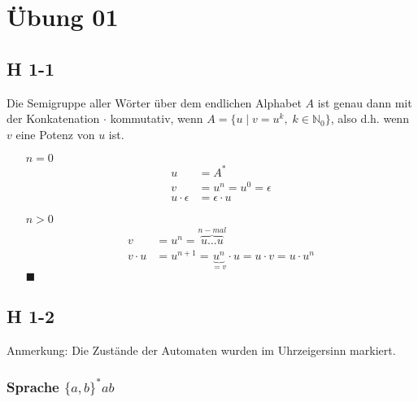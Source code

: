 \documentclass{scrartcl}
\begin{document}
\section{Übung 01}

\subsection{H 1-1}

Die Semigruppe aller Wörter über dem endlichen Alphabet $A$ ist genau dann mit der Konkatenation $\cdot$ kommutativ, wenn $A=\{u\;|\;v = u^k,\;k \in \mathbb{N}_0\}$, also d.h. wenn $v$ eine Potenz von $u$ ist.

\begin{itemize}
    \item[$n=0$]
    \begin{align*}
        u &= A^*\\
        v&=u^n = u^0 = \epsilon\\
        u\cdot\epsilon &= \epsilon\cdot u
    \end{align*}
    \item[$n>0$]
    \begin{align*}
        v &= u^n = \overbrace{u\ldots u}^{n-mal}\\
        v \cdot u &= u^{n+1} = \underbrace{u^n}_{=v} \cdot u = u \cdot v = u \cdot u^n
    \end{align*}
    \hfill$\blacksquare$
\end{itemize}

\subsection{H 1-2}

Anmerkung: Die Zustände der Automaten wurden im Uhrzeigersinn markiert.

\subsubsection{Sprache $\{a,b\}^*ab$}
\end{document}
